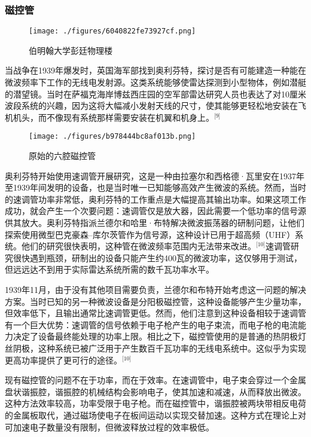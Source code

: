 \subsubsection{磁控管}
\begin{figure}[ht]
\centering
\texttt{[image: ./figures/6040822fe73927cf.png]}
\caption{伯明翰大学彭廷物理楼} \label{fig_YHldr_2}
\end{figure}
当战争在1939年爆发时，英国海军部找到奥利芬特，探讨是否有可能建造一种能在微波频率下工作的无线电发射源。这类系统能够使雷达探测到小型物体，例如潜艇的潜望镜。当时在萨福克海岸博兹西庄园的空军部雷达研究人员也表达了对10厘米波段系统的兴趣，因为这将大幅减小发射天线的尺寸，使其能够更轻松地安装在飞机机头，而不像现有系统那样需要安装在机翼和机身上。\(^\text{[9]}\)
\begin{figure}[ht]
\centering
\texttt{[image: ./figures/b978444bc8af013b.png]}
\caption{原始的六腔磁控管} \label{fig_YHldr_3}
\end{figure}
奥利芬特开始使用速调管开展研究，这是一种由拉塞尔和西格德·瓦里安在1937年至1939年间发明的设备，也是当时唯一已知能够高效产生微波的系统。然而，当时的速调管功率非常低，奥利芬特的工作重点是大幅提高其输出功率。如果这项工作成功，就会产生一个次要问题：速调管仅是放大器，因此需要一个低功率的信号源供其放大。奥利芬特指派兰德尔和哈里·布特解决微波振荡器的研制问题，让他们探索使用微型巴克豪森–库尔茨管作为信号源，这种设计已用于超高频（UHF）系统。他们的研究很快表明，这种管在微波频率范围内无法带来改进。\(^\text{[10]}\)速调管研究很快遇到瓶颈，研制出的设备只能产生约400瓦的微波功率，这仅够用于测试，但远远达不到用于实际雷达系统所需的数千瓦功率水平。

1939年11月，由于没有其他项目需要负责，兰德尔和布特开始考虑这一问题的解决方案。当时已知的另一种微波设备是分阳极磁控管，这种设备能够产生少量功率，但效率低下，且输出通常比速调管更低。然而，他们注意到这种设备相较于速调管有一个巨大优势：速调管的信号依赖于电子枪产生的电子束流，而电子枪的电流能力决定了设备最终能处理的功率上限。相比之下，磁控管使用的是普通的热阴极灯丝阴极，这种系统已被广泛用于产生数百千瓦功率的无线电系统中。这似乎为实现更高功率提供了更可行的途径。\(^\text{[10]}\)

现有磁控管的问题不在于功率，而在于效率。在速调管中，电子束会穿过一个金属盘状谐振腔，谐振腔的机械结构会影响电子，使其加速和减速，从而释放出微波。这种方法效率较高，功率受限于电子枪。而在磁控管中，谐振腔被两块带相反电荷的金属板取代，通过磁场使电子在板间运动以实现交替加速。这种方式在理论上对可加速电子数量没有限制，但微波释放过程的效率极低。
